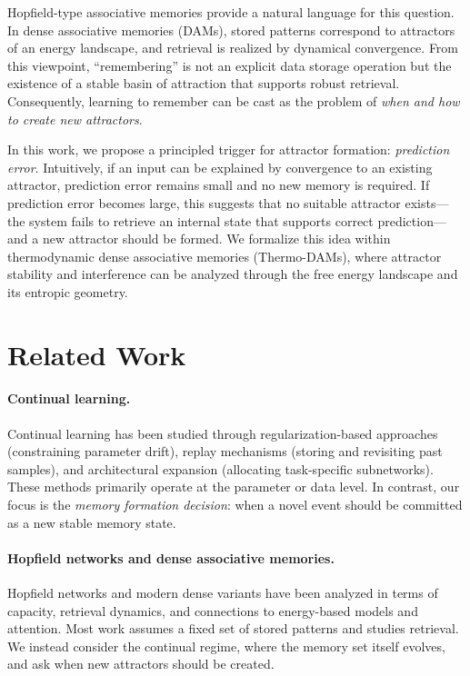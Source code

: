 \documentclass[11pt,a4paper]{article}
\begin{document}
Hopfield-type associative memories provide a natural language for this question.
In dense associative memories (DAMs), stored patterns correspond to attractors of an energy landscape, and retrieval is realized by dynamical convergence.
From this viewpoint, ``remembering'' is not an explicit data storage operation but the existence of a stable basin of attraction that supports robust retrieval.
Consequently, learning to remember can be cast as the problem of \emph{when and how to create new attractors}.

In this work, we propose a principled trigger for attractor formation: \emph{prediction error}.
Intuitively, if an input can be explained by convergence to an existing attractor, prediction error remains small and no new memory is required.
If prediction error becomes large, this suggests that no suitable attractor exists---the system fails to retrieve an internal state that supports correct prediction---and a new attractor should be formed.
We formalize this idea within thermodynamic dense associative memories (Thermo-DAMs), where attractor stability and interference can be analyzed through the free energy landscape and its entropic geometry.

\section{Related Work}

\paragraph{Continual learning.}
Continual learning has been studied through regularization-based approaches (constraining parameter drift), replay mechanisms (storing and revisiting past samples), and architectural expansion (allocating task-specific subnetworks).
These methods primarily operate at the parameter or data level.
In contrast, our focus is the \emph{memory formation decision}: when a novel event should be committed as a new stable memory state.

\paragraph{Hopfield networks and dense associative memories.}
Hopfield networks and modern dense variants have been analyzed in terms of capacity, retrieval dynamics, and connections to energy-based models and attention.
Most work assumes a fixed set of stored patterns and studies retrieval.
We instead consider the continual regime, where the memory set itself evolves, and ask when new attractors should be created.
\end{document}
